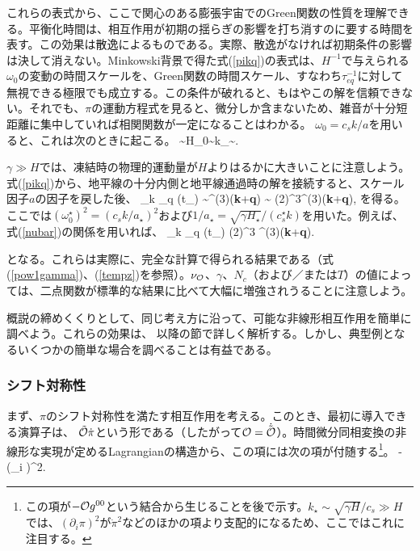 これらの表式から、ここで関心のある膨張宇宙でのGreen関数の性質を理解できる。平衡化時間は、相互作用が初期の揺らぎの影響を打ち消すのに要する時間を表す。この効果は散逸によるものである。実際、散逸がなければ初期条件の影響は決して消えない。Minkowski背景で得た式(\ref{pikq})の表式は、$H^{-1}$で与えられる$\omega_0$の変動の時間スケールを、Green関数の時間スケール、すなわち$\tau_{eq}^{-1}$に対して無視できる極限でも成立する。この条件が破れると、もはやこの解を信頼できない。それでも、$\pi$の運動方程式を見ると、微分しか含まないため、雑音が十分短距離に集中していれば相関関数が一定になることはわかる。
$\omega_0=c_s k/a$を用いると、これは次のときに起こる。
\beq
{}\sim H\quad\Rightarrow\quad \omega_0\sim{}\quad\Rightarrow \quad k_\star \sim {}.
\eeq

$\gamma\gg H$では、凍結時の物理的運動量が$H$よりはるかに大きいことに注意しよう。式(\ref{pikq})から、地平線の十分内側と地平線通過時の解を接続すると、スケール因子$a$の因子を戻した後、
\beq
\label{tpnuo}
\langle \pi_k \pi_q \rangle (t_\star) \sim {}\delta^{(3)}({\bf k}+{\bf q}) \sim {} (2\pi)^3\delta^{(3)}({\bf k}+{\bf q}),
\eeq
を得る。ここでは$(\omega^\star_0)^2= (c_sk/a_\star)^2$および$1/a_\star = \sqrt{\gamma H_\star}/(c^\star_s k)$を用いた。例えば、式(\ref{nubar})の関係を用いれば、
\beq
\label{tpwarm}
\langle \pi_k \pi_q \rangle (t_\star)  \simeq (2\pi)^3 \delta^{(3)}({\bf k}+{\bf q}).
\eeq 

となる。これらは実際に、完全な計算で得られる結果である（式(\ref{pow1gamma})、(\ref{tempz})を参照）。$\nu_{\cal O}$、$\gamma$、$N_c$（および／または$T$）の値によっては、二点関数が標準的な結果に比べて大幅に増強されうることに注意しよう。

\label{nonlineff}

概説の締めくくりとして、同じ考え方に沿って、可能な非線形相互作用を簡単に調べよう。これらの効果は、
以降の節で詳しく解析する。しかし、典型例となるいくつかの簡単な場合を調べることは有益である。

\subsubsection{シフト対称性}\label{shsym}

まず、$\pi$のシフト対称性を満たす相互作用を考える。このとき、最初に導入できる演算子は、
$\tilde{{\cal O}}\dot\pi$という形である（したがって${\cal O}=\dot{\tilde{{\cal O}}}$）。時間微分同相変換の非線形な実現が定めるLagrangianの構造から、この項には次の項が付随する\footnote{この項が$-{\cal O} g^{00}$という結合から生じることを後で示す。$k_\star \sim \sqrt{\gamma H} /c_s\gg H$では、$(\partial_i\pi)^2$が$\dot\pi^2$などのほかの項より支配的になるため、ここではこれに注目する。}。
\beq
\label{dipi}
-\tilde\calo (\partial_i \pi)^2.
\eeq

